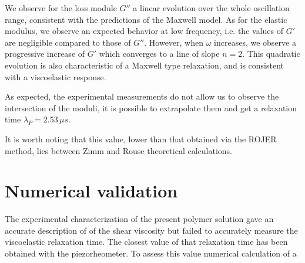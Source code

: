 \documentclass[twocolumn,10pt]{asme2ej}
\begin{document}
We observe for the loss module $G''$ a linear evolution over the whole oscillation range, consistent with the predictions of the Maxwell model. As for the elastic modulus, we observe an expected behavior at low frequency, i.e. the values of $ G'$ are negligible compared to those of $ G''$. However, when $\omega $ increases, we observe a progressive increase of $ G'$ which converges to a line of slope $ n = 2 $. This quadratic evolution is also characteristic of a Maxwell type relaxation, and  is consistent with a viscoelastic response. 

As expected, the experimental measurements do not allow us to observe the intersection of the moduli, it is possible to extrapolate them and get a relaxation time $ \lambda_{P} = 2.53 \, \mu s $.

It is worth noting that this value, lower than that obtained via the ROJER method, lies between Zimm and Rouse theoretical calculations.

\section{Numerical validation}

The experimental characterization of the present polymer solution gave an accurate description of of the shear viscosity but failed to accurately measure the viscoelastic relaxation time. The closest value of that relaxation time has been obtained with the piezorheometer. To assess this value numerical calculation of a 



\end{document}
